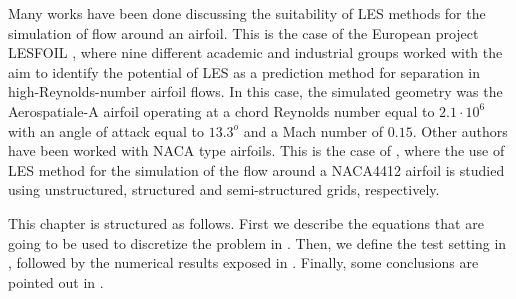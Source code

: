 Many works have been done discussing the suitability of LES methods for the simulation of flow around an airfoil. This is the case of the European project LESFOIL \cite{davidson_lesfoil:_2003}, where nine different academic and industrial groups worked with the aim to identify the potential of LES as a prediction method for separation in high-Reynolds-number airfoil flows. In this case, the simulated geometry was the Aerospatiale-A airfoil operating at a chord Reynolds number equal to $2.1\cdot10^6$ with an angle of attack equal to $13.3^o$ and a Mach number of $0.15$. Other authors have been worked with NACA type airfoils. This is the case of \cite{jansen_stabilized_1999, kaltenbach_large-eddy_1995, schmidt_assessment_????}, where the use of LES method for the simulation of the flow around a NACA4412 airfoil is studied using unstructured, structured and semi-structured grids, respectively.

This chapter is structured as follows. First we describe the equations that are going to be used to discretize the problem in . Then, we define the test setting in , followed by the numerical results exposed in . Finally, some conclusions are pointed out in .

%


